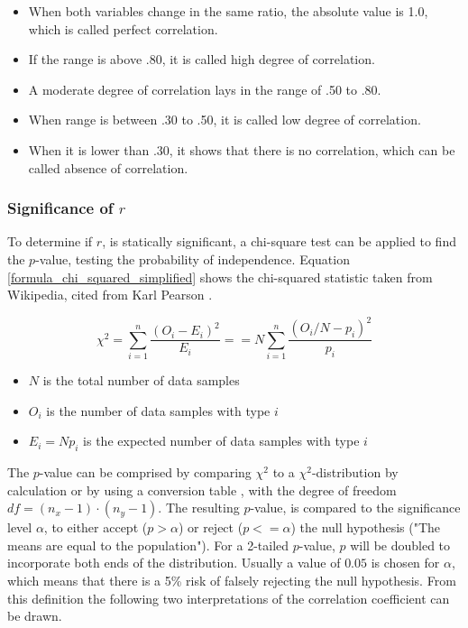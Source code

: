 \documentclass[a4paper,12pt]{report}
\begin{document}
\begin{itemize}
  \item When both variables change in the same ratio, the absolute value is 1.0, which is called perfect correlation.
  \item If the range is above .80, it is called high degree of correlation.
  \item A moderate degree of correlation lays in the range of .50 to .80.
  \item When range is between .30 to .50, it is called low degree of correlation.
  \item When it is lower than .30, it shows that there is no correlation, which can be called absence of correlation.
\end{itemize}	

\subsubsection{Significance of $r$}
To determine if $r$, is statically significant, a chi-square test can be applied to find the $p$-value, testing the probability of independence. Equation \ref{formula_chi_squared_simplified} shows the chi-squared statistic taken from Wikipedia, cited from Karl Pearson \cite{Pearson1990}.

\smallskip


\begin{equation}
\label{formula_chi_squared_simplified}	
	\chi^2 = \sum_{i=1}^{n}{\frac{(O_i-E_i)^2}{E_i}} == N\sum_{i=1}^{n}{\frac{(O_i/N-p_i)^2}{p_i}}
\end{equation}

\begin{itemize}
	\setlength\itemsep{0.1em}	
	\item[] $N$ is the total number of data samples 
	\item[] $O_i$ is the number of data samples with type $i$
	\item[] $E_i = N p_i$ is the expected number of data samples with type $i$
\end{itemize}

The $p$-value can be comprised by comparing $\chi^2$ to a $\chi^2$-distribution by calculation or by using a conversion table \cite{Piegorsch2002}, with the degree of freedom $df = (n_x - 1) \cdot (n_y - 1)$. The resulting  $p$-value, is compared to the significance level $\alpha$, to either accept ($p > \alpha$) or reject ($p <= \alpha$) the null hypothesis ("The means are equal to the population"). For a 2-tailed $p$-value, $p$ will be doubled to incorporate both ends of the distribution. Usually a value of $0.05$ is chosen for $\alpha$, which means that there is a 5\% risk of falsely rejecting the null hypothesis. From this definition the following two interpretations of the correlation coefficient can be drawn. \cite{OTSD2020}
\end{document}
